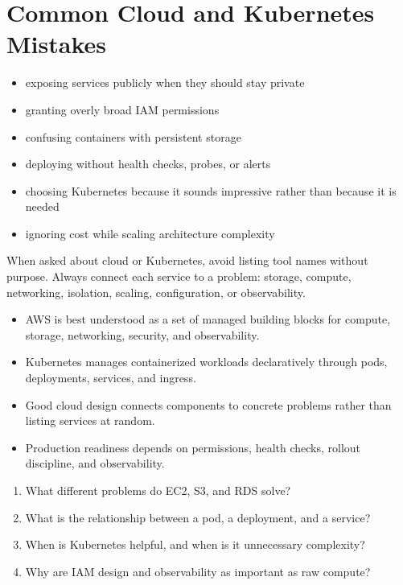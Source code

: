 \documentclass[12pt, a4paper, oneside]{book}
\begin{document}
\section{Common Cloud and Kubernetes Mistakes}

\begin{itemize}[leftmargin=2em]
    \item exposing services publicly when they should stay private
    \item granting overly broad IAM permissions
    \item confusing containers with persistent storage
    \item deploying without health checks, probes, or alerts
    \item choosing Kubernetes because it sounds impressive rather than because it is needed
    \item ignoring cost while scaling architecture complexity
\end{itemize}

\begin{examtipbox}
When asked about cloud or Kubernetes, avoid listing tool names without purpose. Always connect each service to a problem: storage, compute, networking, isolation, scaling, configuration, or observability.
\end{examtipbox}

\begin{summarybox}
\begin{itemize}[leftmargin=2em]
    \item AWS is best understood as a set of managed building blocks for compute, storage, networking, security, and observability.
    \item Kubernetes manages containerized workloads declaratively through pods, deployments, services, and ingress.
    \item Good cloud design connects components to concrete problems rather than listing services at random.
    \item Production readiness depends on permissions, health checks, rollout discipline, and observability.
\end{itemize}
\end{summarybox}

\begin{recallbox}
\begin{enumerate}[leftmargin=2em]
    \item What different problems do EC2, S3, and RDS solve?
    \item What is the relationship between a pod, a deployment, and a service?
    \item When is Kubernetes helpful, and when is it unnecessary complexity?
    \item Why are IAM design and observability as important as raw compute?
\end{enumerate}
\end{recallbox}
\end{document}
